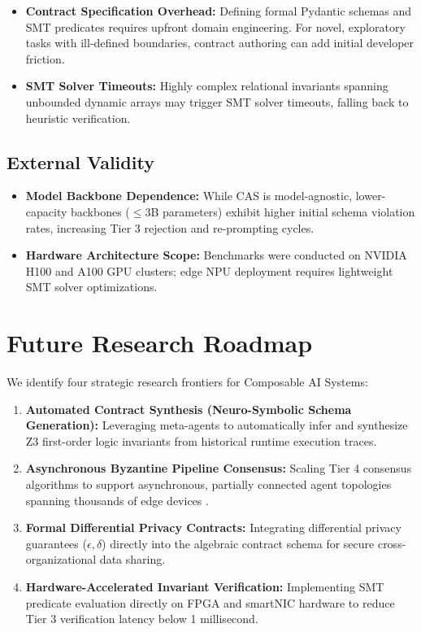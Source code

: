 \documentclass[10pt,twocolumn,letterpaper]{article}
\begin{document}
\begin{itemize}
  \item \textbf{Contract Specification Overhead:} Defining formal Pydantic schemas and SMT predicates requires upfront domain engineering. For novel, exploratory tasks with ill-defined boundaries, contract authoring can add initial developer friction.
  \item \textbf{SMT Solver Timeouts:} Highly complex relational invariants spanning unbounded dynamic arrays may trigger SMT solver timeouts, falling back to heuristic verification.
\end{itemize}


\subsection{External Validity}

\begin{itemize}
  \item \textbf{Model Backbone Dependence:} While CAS is model-agnostic, lower-capacity backbones ($\le 3$B parameters) exhibit higher initial schema violation rates, increasing Tier 3 rejection and re-prompting cycles.
  \item \textbf{Hardware Architecture Scope:} Benchmarks were conducted on NVIDIA H100 and A100 GPU clusters; edge NPU deployment requires lightweight SMT solver optimizations.
\end{itemize}




\section{Future Research Roadmap}


We identify four strategic research frontiers for Composable AI Systems:
\begin{enumerate}
  \item \textbf{Automated Contract Synthesis (Neuro-Symbolic Schema Generation):} Leveraging meta-agents to automatically infer and synthesize Z3 first-order logic invariants from historical runtime execution traces.
  \item \textbf{Asynchronous Byzantine Pipeline Consensus:} Scaling Tier 4 consensus algorithms to support asynchronous, partially connected agent topologies spanning thousands of edge devices \cite{crossref_10_1109_access_2026_3656309}.
  \item \textbf{Formal Differential Privacy Contracts:} Integrating differential privacy guarantees ($\epsilon, \delta$) directly into the algebraic contract schema for secure cross-organizational data sharing.
  \item \textbf{Hardware-Accelerated Invariant Verification:} Implementing SMT predicate evaluation directly on FPGA and smartNIC hardware to reduce Tier 3 verification latency below 1 millisecond.
\end{enumerate}
\end{document}
